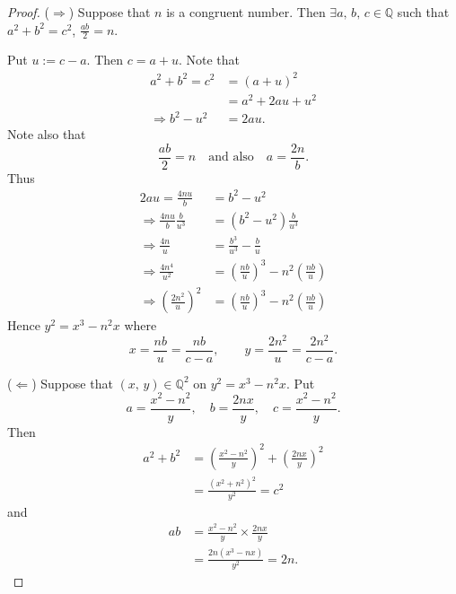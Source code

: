 \begin{proof}
    ($\Rightarrow$) Suppose that $n$ is a congruent number. Then $\exists a,\,b,\,c\in\mathbb{Q}$
    such that $a^2+b^2=c^2$, $\frac{ab}{2}=n$.

    Put $u:=c-a$. Then $c=a+u$. Note that
    \begin{align*}
        a^2+b^2=c^2&=\left(a+u\right)^2 \\
        &= a^2 + 2au + u^2 \\
        \Rightarrow b^2-u^2 &= 2au.
    \end{align*}
    Note also that
    \[
        \frac{ab}{2}=n \quad \mbox{and also} \quad a=\frac{2n}{b}.
    \]
    Thus
    \begin{align*}
        2au = \frac{4nu}{b} &= b^2-u^2 \\
        \Rightarrow \frac{4nu}{b}\frac{b}{u^3} &= \left(b^2-u^2\right)\frac{b}{u^3} \\
        \Rightarrow \frac{4n}{u} &= \frac{b^3}{u^3}-\frac{b}{u} \\
        \Rightarrow \frac{4n^4}{u^2} &= \left(\frac{nb}{u}\right)^3-n^2\left(\frac{nb}{u}\right) \\
        \Rightarrow \left(\frac{2n^2}{u}\right)^2 &= \left(\frac{nb}{u}\right)^3-n^2\left(\frac{nb}{u}\right)
    \end{align*}
    Hence $y^2=x^3-n^2x$ where
    \[
        x=\frac{nb}{u}=\frac{nb}{c-a}, \qquad y=\frac{2n^2}{u}=\frac{2n^2}{c-a}.
    \]

    ($\Leftarrow$) Suppose that $\left(x,\,y\right)\in\mathbb{Q}^2$ on $y^2=x^3-n^2x$.
    Put
    \[
        a=\frac{x^2-n^2}{y},\quad b=\frac{2nx}{y},\quad c=\frac{x^2-n^2}{y}.
    \]
    Then
    \begin{align*}
        a^2+b^2 &= \left(\frac{x^2-n^2}{y}\right)^2+\left(\frac{2nx}{y}\right)^2 \\
        &= \frac{\left(x^2+n^2\right)^2}{y^2} = c^2
    \end{align*}
    and 
    \begin{align*}
        ab &= \frac{x^2-n^2}{y} \times \frac{2nx}{y} \\
        &= \frac{2n\left(x^3-nx\right)}{y^2}= 2n.
    \end{align*}
\end{proof}